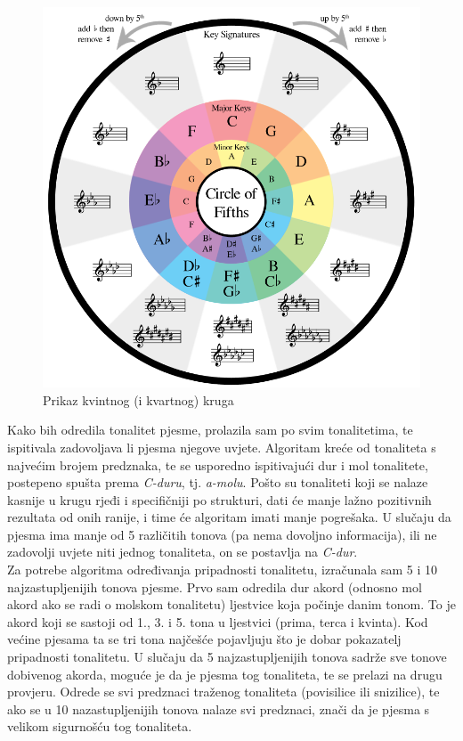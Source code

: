 \documentclass[times, utf8, zavrsni, numeric]{fer}
\begin{document}
\begin{figure}[h]
	\includegraphics[scale=1.4]{fifths.png}
	\centering
	\caption{Prikaz kvintnog (i kvartnog) kruga\cite{fifths}}
	\label{fig:fifths}
\end{figure}

Kako bih odredila tonalitet pjesme, prolazila sam po svim tonalitetima, te ispitivala zadovoljava li pjesma njegove uvjete. Algoritam kreće od tonaliteta s najvećim brojem predznaka, te se usporedno ispitivajući dur i mol tonalitete, postepeno spušta prema \textit{C-duru}, tj. \textit{a-molu}. Pošto su tonaliteti koji se nalaze kasnije u krugu rjeđi i specifičniji po strukturi, dati će manje lažno pozitivnih rezultata od onih ranije, i time će algoritam imati manje pogrešaka. U slučaju da pjesma ima manje od 5 različitih tonova (pa nema dovoljno informacija), ili ne zadovolji uvjete niti jednog tonaliteta, on se postavlja na \textit{C-dur}.\\

Za potrebe algoritma određivanja pripadnosti tonalitetu, izračunala sam 5 i 10 najzastupljenijih tonova pjesme. Prvo sam odredila dur akord (odnosno mol akord ako se radi o molskom tonalitetu) ljestvice koja počinje danim tonom. To je akord koji se sastoji od 1., 3. i 5. tona u ljestvici (prima, terca i kvinta). Kod većine pjesama ta se tri tona najčešće pojavljuju što je dobar pokazatelj pripadnosti tonalitetu. U slučaju da 5 najzastupljenijih tonova sadrže sve tonove dobivenog akorda, moguće je da je pjesma tog tonaliteta, te se prelazi na drugu provjeru. Odrede se svi predznaci traženog tonaliteta (povisilice ili snizilice), te ako se u 10 nazastupljenijih tonova nalaze svi predznaci, znači da je pjesma s velikom sigurnošću tog tonaliteta.
\end{document}
